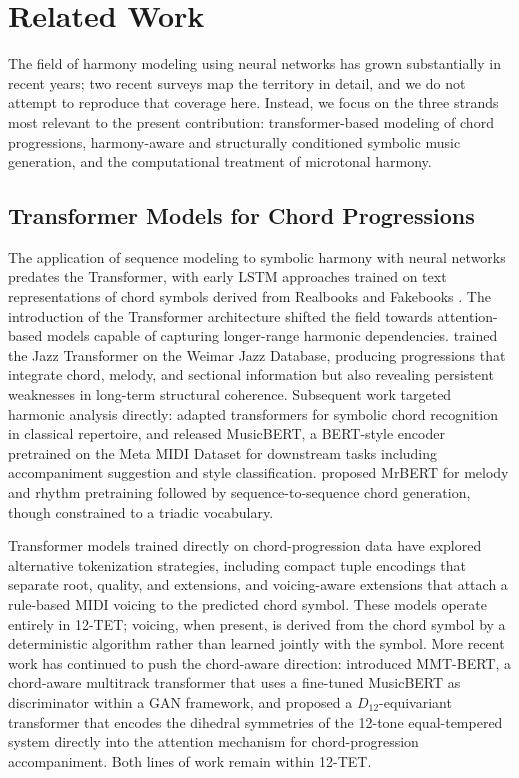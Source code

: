 \documentclass{aimc2026}
\begin{document}
\section{Related Work}
\label{sec:related_work}

The field of harmony modeling using neural networks has grown substantially in recent years; two recent surveys \citep{le2025natural, ji2023survey} map the territory in detail, and we do not attempt to reproduce that coverage here. Instead, we focus on the three strands most relevant to the present contribution: transformer-based modeling of chord progressions, harmony-aware and structurally conditioned symbolic music generation, and the computational treatment of microtonal harmony.

\subsection{Transformer Models for Chord Progressions}

The application of sequence modeling to symbolic harmony with neural networks predates the Transformer, with early LSTM approaches trained on text representations of chord symbols derived from Realbooks and Fakebooks \citep{Choi2016a, choi2016text}. The introduction of the Transformer architecture \citep{vaswani2017attention} shifted the field towards attention-based models capable of capturing longer-range harmonic dependencies. \citet{wu2020jazz} trained the Jazz Transformer on the Weimar Jazz Database, producing progressions that integrate chord, melody, and sectional information but also revealing persistent weaknesses in long-term structural coherence. Subsequent work targeted harmonic analysis directly: \citet{chen2021attend} adapted transformers for symbolic chord recognition in classical repertoire, and \citet{zeng2021musicbert} released MusicBERT, a BERT-style encoder pretrained on the Meta MIDI Dataset \cite{ens_2021_5142664} for downstream tasks including accompaniment suggestion and style classification. \citet{li2023mrbert} proposed MrBERT for melody and rhythm pretraining followed by sequence-to-sequence chord generation, though constrained to a triadic vocabulary.

Transformer models trained directly on chord-progression data \citep{dalmazzo2024chordinator, dalmazzo2024chromaflow} have explored alternative tokenization strategies, including compact tuple encodings that separate root, quality, and extensions, and voicing-aware extensions that attach a rule-based MIDI voicing to the predicted chord symbol. These models operate entirely in 12-TET; voicing, when present, is derived from the chord symbol by a deterministic algorithm rather than learned jointly with the symbol. More recent work has continued to push the chord-aware direction: \citet{zhu2024mmt} introduced MMT-BERT, a chord-aware multitrack transformer that uses a fine-tuned MusicBERT as discriminator within a GAN framework, and \citet{luo2024music102} proposed a $D_{12}$-equivariant transformer that encodes the dihedral symmetries of the 12-tone equal-tempered system directly into the attention mechanism for chord-progression accompaniment. Both lines of work remain within 12-TET.
\end{document}
